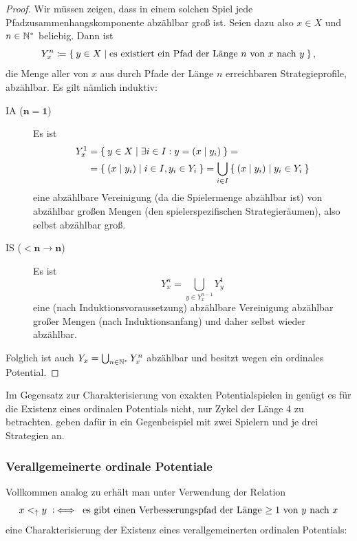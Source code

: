 \begin{proof}
	Wir müssen zeigen, dass in einem solchen Spiel jede Pfadzusammenhangskomponente abzählbar groß ist. Seien dazu also $x \in X$ und $n \in \mathbb{N}^\ast$ beliebig. Dann ist
	\[Y_x^n \coloneqq \Set{y \in X | \text{es existiert ein Pfad der Länge $n$ von $x$ nach $y$}}, \]
	die Menge aller von $x$ aus durch Pfade der Länge $n$ erreichbaren Strategieprofile, abzählbar. Es gilt nämlich induktiv:
	\begin{description}
		\item[IA ($\bm{n=1}$)] Es ist
		\begin{align*}
			Y_x^1 	&= \Set{y \in X | \exists i \in I: y = (x \mid y_i)} = \\
					&= \Set{(x \mid y_i) | i \in I, y_i \in Y_i } = \bigcup_{i \in I} \Set{(x \mid y_i) | y_i \in Y_i }
		\end{align*}
		eine abzählbare Vereinigung (da die Spielermenge abzählbar ist) von abzählbar großen Mengen (den spielerspezifischen Strategieräumen), also selbst abzählbar groß.
		\item[IS ($\bm{<n \to n}$)] Es ist
		\[Y_x^n = \bigcup_{y \in Y_x^{n-1}} Y_y^1\]
		eine (nach Induktionsvoraussetzung) abzählbare Vereinigung abzählbar großer Mengen (nach Induktionsanfang) und daher selbst wieder abzählbar.
	\end{description}
	Folglich ist auch $Y_x = \bigcup_{n\in\mathbb{N}^\ast} Y_x^n$ abzählbar und besitzt wegen  ein ordinales Potential.
\end{proof}

\begin{bem}
	Im Gegensatz zur Charakterisierung von exakten Potentialspielen in  genügt es für die Existenz eines ordinalen Potentials nicht, nur Zykel der Länge 4 zu betrachten. \citeauthor{CharExOrdPot} geben dafür in \cite[Beispiel 3.1]{CharExOrdPot} ein Gegenbeispiel mit zwei Spielern und je drei Strategien an.
\end{bem}


\subsubsection{Verallgemeinerte ordinale Potentiale}

Vollkommen analog zu  erhält man unter Verwendung der Relation
	\[x <_\uparrow y \mathbin{~\mathop:\!\!\iff} \text{ es gibt einen Verbesserungspfad der Länge $\geq 1$ von $y$ nach $x$}\]
eine Charakterisierung der Existenz eines verallgemeinerten ordinalen Potentials:

